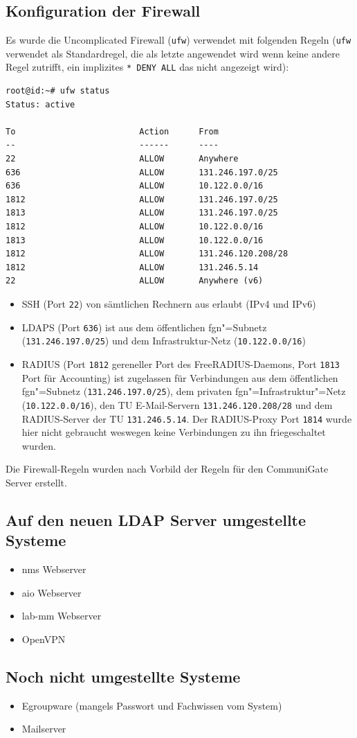 \documentclass[11pt,a4paper,titlepage=firstiscover,headsepline,bibtotoc]{scrartcl} %
\begin{document}
\subsection{Konfiguration der Firewall}\label{sec:Firewall-Konfig}
Es wurde die Uncomplicated Firewall (\texttt{ufw}) verwendet mit folgenden Regeln (\texttt{ufw} verwendet als Standardregel, die als letzte angewendet wird wenn keine andere Regel zutrifft, ein implizites \texttt{* DENY ALL} das nicht angezeigt wird):
\begin{lstlisting}
root@id:~# ufw status
Status: active

To                         Action      From
--                         ------      ----
22                         ALLOW       Anywhere
636                        ALLOW       131.246.197.0/25
636                        ALLOW       10.122.0.0/16
1812                       ALLOW       131.246.197.0/25
1813                       ALLOW       131.246.197.0/25
1812                       ALLOW       10.122.0.0/16
1813                       ALLOW       10.122.0.0/16
1812                       ALLOW       131.246.120.208/28
1812                       ALLOW       131.246.5.14
22                         ALLOW       Anywhere (v6)
\end{lstlisting}
\begin{itemize}
\item SSH (Port \texttt{22}) von sämtlichen Rechnern aus erlaubt (IPv4 und IPv6)
\item LDAPS (Port \texttt{636}) ist aus dem öffentlichen fgn"=Subnetz (\texttt{131.246.197.0/25}) und dem Infrastruktur-Netz (\texttt{10.122.0.0/16})
\item RADIUS (Port \texttt{1812} gereneller Port des FreeRADIUS-Daemons, Port \texttt{1813} Port für Accounting) ist zugelassen für Verbindungen aus dem öffentlichen fgn"=Subnetz (\texttt{131.246.197.0/25}), dem privaten fgn"=Infrastruktur"=Netz (\texttt{10.122.0.0/16}), den TU E-Mail-Servern \texttt{131.246.120.208/28} und dem RADIUS-Server der TU \texttt{131.246.5.14}. Der RADIUS-Proxy Port \texttt{1814} wurde hier nicht gebraucht weswegen keine Verbindungen zu ihn friegeschaltet wurden.
\end{itemize}
Die Firewall-Regeln wurden nach Vorbild der Regeln für den CommuniGate Server erstellt.

\subsection{Auf den neuen LDAP Server umgestellte Systeme}
\begin{itemize}
\item nms Webserver
\item aio Webserver
\item lab-mm Webserver
\item OpenVPN
\end{itemize}

\subsection{Noch nicht umgestellte Systeme}
\begin{itemize}
\item Egroupware (mangels Passwort und Fachwissen vom System)
\item Mailserver
\end{itemize}
\end{document}
